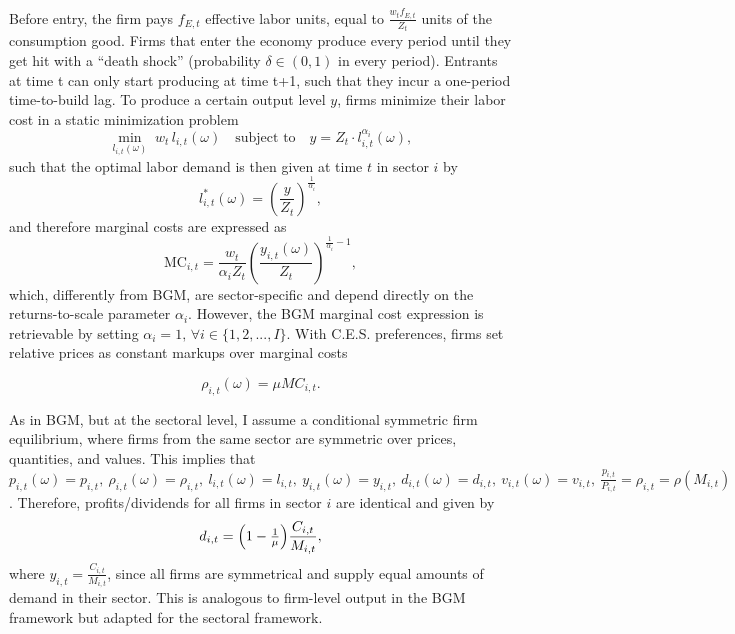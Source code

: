 \documentclass[a4paper,12pt]{article} %
\numberwithin{equation}{section} %
\numberwithin{figure}{section}
\numberwithin{table}{section}
\begin{document}
Before entry, the firm pays $f_{E,t}$ effective labor units, equal to $\frac{w_tf_{E,t}}{Z_t}$ units of the consumption good. 
Firms that enter the economy produce every period until they get hit with a ``death shock'' (probability $\delta \in (0,1)$ in every period). 
Entrants at time t can only start producing at time t+1, such that they incur a one-period time-to-build lag. 
To produce a certain output level $y$, firms minimize their labor cost in a static minimization problem
\[
    \min_{l_{i,t}(\omega)} \; w_t\,l_{i,t}(\omega) \quad \text{subject to} \quad y = Z_t \cdot l_{i,t}^{\alpha_i}(\omega),
\]
such that the optimal labor demand is then given at time $t$ in sector $i$ by 
\begin{equation}
  l_{i,t}^*(\omega) = \left(\frac{y}{Z_t}\right)^{\frac{1}{\alpha_i}},\label{eq:laborClearing}
\end{equation}
and therefore marginal costs are expressed as
\begin{equation}
  \text{MC}_{i,t} = \frac{w_t}{\alpha_i Z_t}\left(\frac{y_{i,t}(\omega)}{Z_t}\right)^{\!\frac{1}{\alpha_i}-1},\label{eq:marginalcost}
\end{equation}
which, differently from BGM, are sector-specific and depend directly on the returns-to-scale parameter $\alpha_i$. However, the BGM
marginal cost expression is retrievable by setting $\alpha_i = 1, \, \forall i \in \{1,2,...,I\}$. With C.E.S. preferences, firms set relative
prices as constant markups over marginal costs 

\begin{equation}
  \rho_{i,t}(\omega) = \mu MC_{i,t}.\label{eq:pricing}
\end{equation}

As in BGM, but at the sectoral level, I assume a conditional symmetric firm equilibrium, where firms from the same sector 
are symmetric over prices, quantities, and values. 
This implies that $p_{i,t}(\omega) = p_{i,t}, \ \rho_{i,t}(\omega) = \rho_{i,t}   , \   l_{i,t}(\omega) = l_{i,t}   , 
\  y_{i,t}(\omega) = y_{i,t}   , \  d_{i,t}(\omega) = d_{i,t}   ,  \ v_{i,t}(\omega) = v_{i,t}   , \  
\frac{p_{i,t}}{P_{i,t}} = \rho_{i,t} = \rho(M_{i,t})$. Therefore, profits/dividends for all firms in 
sector $i$ are identical and given by
\begin{equation}
  d_{i,t} = \Bigl(1-\tfrac1\mu\Bigr)\frac{C_{i,t}}{M_{i,t}}, \label{eq:profit}
\end{equation}
where $y_{i,t} = \frac{C_{i,t}}{M_{i,t}}$, since all firms are symmetrical and supply equal amounts of demand in their sector. This is analogous to firm-level
output in the BGM framework but adapted for the sectoral framework.
\end{document}
